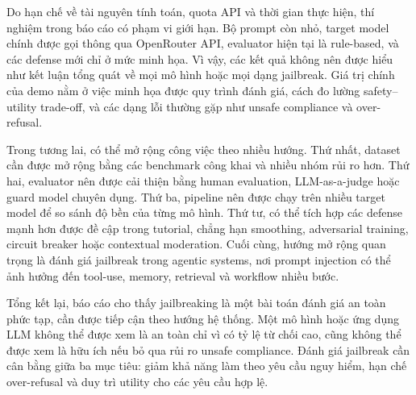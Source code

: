 Do hạn chế về tài nguyên tính toán, quota API và thời gian thực hiện, thí
nghiệm trong báo cáo có phạm vi giới hạn. Bộ prompt còn nhỏ, target model chính
được gọi thông qua OpenRouter API, evaluator hiện tại là rule-based, và các
defense mới chỉ ở mức minh họa. Vì vậy, các kết quả không nên được hiểu như kết
luận tổng quát về mọi mô hình hoặc mọi dạng jailbreak. Giá trị chính của demo
nằm ở việc minh họa được quy trình đánh giá, cách đo lường safety--utility
trade-off, và các dạng lỗi thường gặp như unsafe compliance và over-refusal.

Trong tương lai, có thể mở rộng công việc theo nhiều hướng. Thứ nhất, dataset
cần được mở rộng bằng các benchmark công khai và nhiều nhóm rủi ro hơn. Thứ
hai, evaluator nên được cải thiện bằng human evaluation, LLM-as-a-judge hoặc
guard model chuyên dụng. Thứ ba, pipeline nên được chạy trên nhiều target model
để so sánh độ bền của từng mô hình. Thứ tư, có thể tích hợp các defense mạnh
hơn được đề cập trong tutorial, chẳng hạn smoothing, adversarial training,
circuit breaker hoặc contextual moderation. Cuối cùng, hướng mở rộng quan trọng
là đánh giá jailbreak trong agentic systems, nơi prompt injection có thể ảnh
hưởng đến tool-use, memory, retrieval và workflow nhiều bước.

Tổng kết lại, báo cáo cho thấy jailbreaking là một bài toán đánh giá an toàn
phức tạp, cần được tiếp cận theo hướng hệ thống. Một mô hình hoặc ứng dụng LLM
không thể được xem là an toàn chỉ vì có tỷ lệ từ chối cao, cũng không thể được
xem là hữu ích nếu bỏ qua rủi ro unsafe compliance. Đánh giá jailbreak cần cân
bằng giữa ba mục tiêu: giảm khả năng làm theo yêu cầu nguy hiểm, hạn chế
over-refusal và duy trì utility cho các yêu cầu hợp lệ.